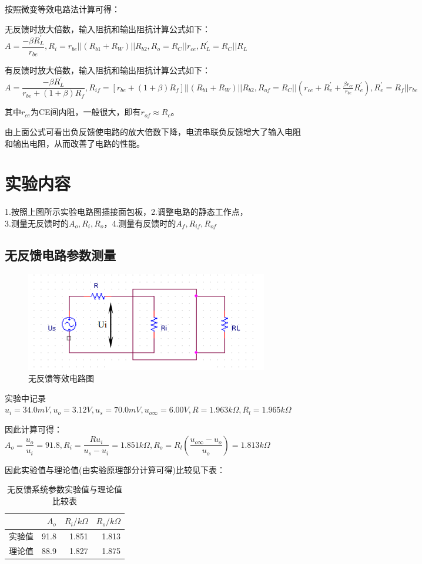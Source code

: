 \documentclass[a4 paper,12pt]{article}
\begin{document}
\par 按照微变等效电路法计算可得：
\par 无反馈时放大倍数，输入阻抗和输出阻抗计算公式如下：$A=\dfrac{-\beta R_{L}^{\prime}}{r_{be}},R_{i}=r_{be}||(R_{b1}+R_{W})||R_{b2},R_{o}=R_{C}||r_{ce},R_{L}^{\prime}=R_{C}||R_{L}$
\par 有反馈时放大倍数，输入阻抗和输出阻抗计算公式如下：$A=\dfrac{-\beta R_{L}^{\prime}}{r_{be}+(1+\beta) R_{f}},R_{if}=[r_{be}+(1+\beta )R_{f}]||(R_{b1}+R_{W})||R_{b2},R_{of}=R_{C}||(r_{ce}+R_{e}^{\prime}+\frac{\beta r_{ce}}{r_{be}}R_{e}^{\prime}),R_{e}^{\prime}=R_{f}||r_{be}$
\par 其中$r_{ce}$为CE间内阻，一般很大，即有$r_{of}\approx R_{c}$。
\par 由上面公式可看出负反馈使电路的放大倍数下降，电流串联负反馈增大了输入电阻和输出电阻，从而改善了电路的性能。

	\section{实验内容}
	\noindent
	1.按照上图所示实验电路图插接面包板，2.调整电路的静态工作点，\\
	3.测量无反馈时的$A_{o},R_{i},R_{o}$，4.测量有反馈时的$A_{f},R_{if},R_{of}$
	\subsection{无反馈电路参数测量}
	\begin{figure}[H]
	\centering
	\hspace{2em}\includegraphics[width=.65\linewidth]{pic/3.png}
	\caption{无反馈等效电路图
	}
\end{figure}
\par 实验中记录$u_{i}=34.0mV,u_{o}=3.12V,u_{s}=70.0mV,u_{o\infty}=6.00V,R=1.963k\Omega,R_{l}=1.965k\Omega$
\par 因此计算可得：$A_{o}=\dfrac{u_{o}}{u_{i}}=91.8,R_{i}=\dfrac{Ru_{i}}{u_{s}-u_{i}}=1.851k\Omega,R_{o}=R_{l}(\dfrac{u_{o\infty}-u_{o}}{u_{o}})=1.813k\Omega$
\par 因此实验值与理论值(由实验原理部分计算可得)比较见下表：
\begin{table}[H]
	\centering
	\caption{无反馈系统参数实验值与理论值比较表}
	\begin{tabular}{|r|r|r|r|}
		\toprule[0.5mm]
		&$A_{o}$&$R_{i}/k\Omega$&$R_{o}/k\Omega$\\
		\midrule
		实验值&91.8&1.851&1.813\\
		\midrule
		理论值&88.9&1.827&1.875\\
		\bottomrule[0.5mm]
	\end{tabular}
\end{table}
\end{document}
